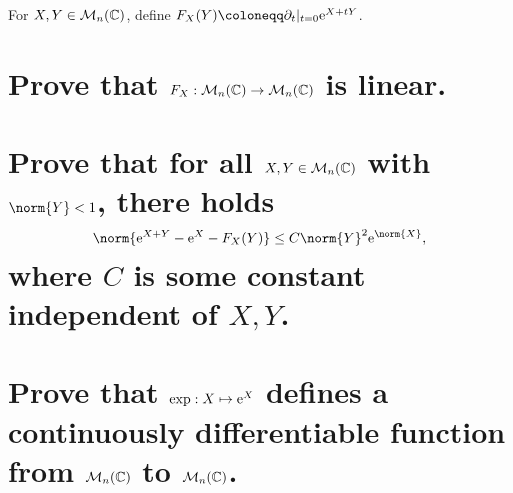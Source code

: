 \documentclass[
	pages,
	boxes,
	color=WildStrawberry
]{homework}
\begin{document}
\begin{problem}
For $X, Y\in\mathcal{M}_{n}(\mathbb{C})$, define $F_X(Y)\coloneqq\partial_t|_{t=0}\e^{X + tY}$.
\begin{parts}
	\part{Prove that $F_X:\mathcal{M}_{n}(\mathbb{C})\to\mathcal{M}_{n}(\mathbb{C})$ is linear.}\label{part:7a}
	\part{Prove that for all $X, Y\in\mathcal{M}_{n}(\mathbb{C})$ with $\norm{Y} < 1$, there holds \[\norm{\e^{X + Y} - \e^X - F_X(Y)}\leq C\norm{Y}^2\e^{\norm{X}},\] where $C$ is some constant independent of $X, Y$.}\label{part:7b}
	\part{Prove that $\exp:X\mapsto\mathrm{e}^X$ defines a continuously differentiable function from $\mathcal{M}_{n}(\mathbb{C})$ to $\mathcal{M}_{n}(\mathbb{C})$.}\label{part:7c}
\end{parts}
\end{problem}
\end{document}
